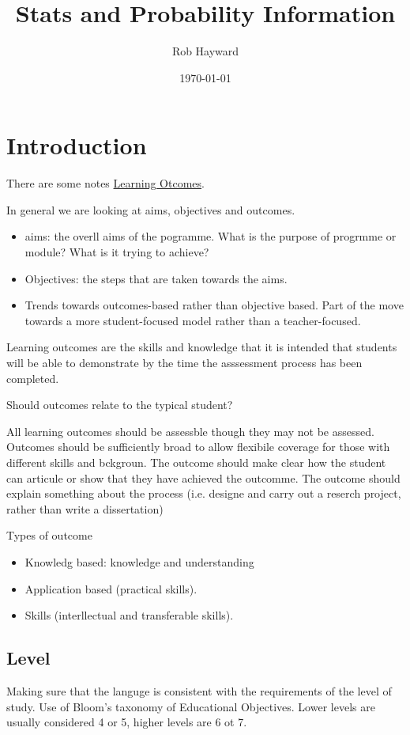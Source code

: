 \documentclass[12pt, a4paper, oneside]{article}\usepackage[]{graphicx}\usepackage[]{color}
\begin{document}
\title{Stats and Probability Information}
\author{Rob Hayward}
\date{\today}
\maketitle

\section{Introduction}
There are some notes \href{http://www.learninginstitute.qmul.ac.uk/wp-content/uploads/2011/05/Aims-and-Outcomes-Guide.pdf}{Learning Otcomes}.

In general we are looking at aims, objectives and outcomes. 
\begin{itemize}
\item aims: the overll aims of the pogramme.  What is the purpose of progrmme or module? What is it trying to achieve? 
\item Objectives: the steps that are taken towards the aims. 
\item  Trends towards outcomes-based rather than objective based. Part of the move towards a more student-focused model rather than a teacher-focused.
\end{itemize}

Learning outcomes are the skills and knowledge that it is intended that students will be able to demonstrate by the time the asssessment process has been completed. 

Should outcomes relate to the typical student? 

All learning outcomes should be assessble though they may not be assessed.  Outcomes should be sufficiently broad to allow flexibile coverage for those with different skills and bckgroun. The outcome should make clear how the student can articule or show that they have achieved the outcomme. The outcome should explain something about the process (i.e. designe and carry out a reserch project, rather than write a dissertation)

Types of outcome
\begin{itemize}
\item Knowledg based:  knowledge and understanding
\item Application based (practical skills). 
\item Skills (interllectual and transferable skills). 
\end{itemize}

\subsection{Level}
Making sure that the languge is consistent with the requirements of the level of study. Use of Bloom's taxonomy of Educational Objectives. Lower levels are usually considered 4 or 5, higher levels are 6 ot 7.  
\end{document}
